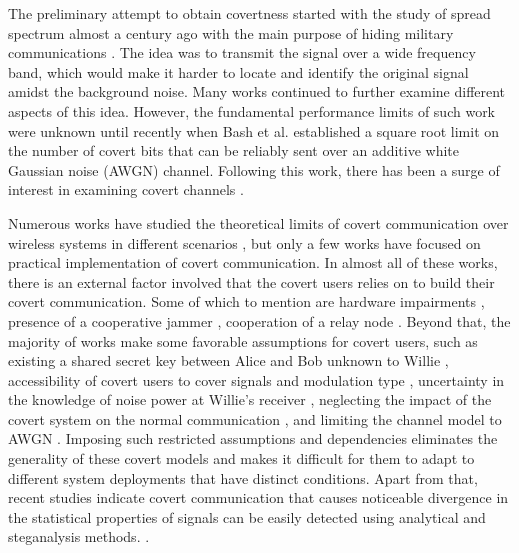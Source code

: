 The preliminary attempt to obtain covertness started with the study of spread spectrum almost a century ago with the main purpose of hiding military communications \cite{scholtz1982origins}. The idea was to transmit the signal over a wide frequency band, which would make it harder to locate and identify the original signal amidst the background noise. Many works continued to further examine different aspects of this idea. However, the fundamental performance limits of such work were unknown until recently when Bash et al. \cite{bash2012square} established a square root limit on the number of covert bits that can be reliably sent over an additive white Gaussian noise (AWGN) channel. Following this work, there has been a surge of interest in examining covert channels \cite{sobers2017covert,soltani2018covert,sheikholeslami2018multi,cao2018wireless}.

Numerous works have studied the theoretical limits of covert communication over wireless systems in different scenarios \cite{bash2012square, soltani2018covert, sheikholeslami2018multi, li2021fundamental}, but only a few works have focused on practical implementation of covert communication. In almost all of these works, there is an external factor involved that the covert users relies on to build their covert communication. Some of which to mention are hardware impairments \cite{mohammed2021adversarial}, presence of a cooperative jammer \cite{sobers2017covert}, cooperation of a relay node \cite{liao2020generative, kim2022covert}. Beyond that, the majority of works make some favorable assumptions for covert users, such as existing a shared secret key between Alice and Bob unknown to Willie \cite{soltani2018covert}, accessibility of covert users to cover signals and modulation type \cite{grzesiak2021wireless}, uncertainty in the knowledge of noise power at Willie's receiver \cite{he2017covert}, neglecting the impact of the covert system on the normal communication \cite{mohammed2021adversarial}, and limiting the channel model to AWGN \cite{mohammed2021adversarial}. Imposing such restricted assumptions and dependencies eliminates the generality of these covert models and makes it difficult for them to adapt to different system deployments that have distinct conditions. Apart from that, recent studies indicate covert communication that causes noticeable divergence in the statistical properties of signals can be easily detected using analytical and steganalysis methods. \cite{bahramali2021robust,huang2020exploiting}.


